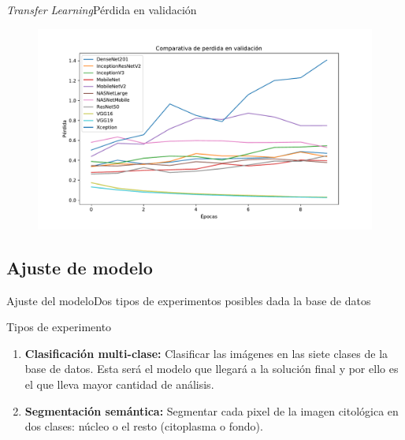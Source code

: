 \documentclass{beamer}
\begin{document}

    \begin{frame}{\emph{Transfer Learning}}{Pérdida en validación}
        \begin{figure}[]
            \centering
            \includegraphics[width=1\textwidth]{perdida_validacion}
        \end{figure}
    \end{frame}

    \subsection{Ajuste de modelo}
    \begin{frame}{Ajuste del modelo}{Dos tipos de experimentos posibles dada la base de datos}
        \begin{exampleblock}{Tipos de experimento}{
            \begin{enumerate}
                \item{\textbf{Clasificación multi-clase:}} Clasificar las
                imágenes en las siete clases de la base de datos. Esta será el
                modelo que llegará a la solución final y por ello es el que
                lleva mayor cantidad de análisis.
                \item{\textbf{Segmentación semántica:}} Segmentar cada pixel de la imagen
                citológica en dos clases: núcleo o el resto (citoplasma o fondo).
            \end{enumerate}
        }
        \end{exampleblock}
    \end{frame}
\end{document}
